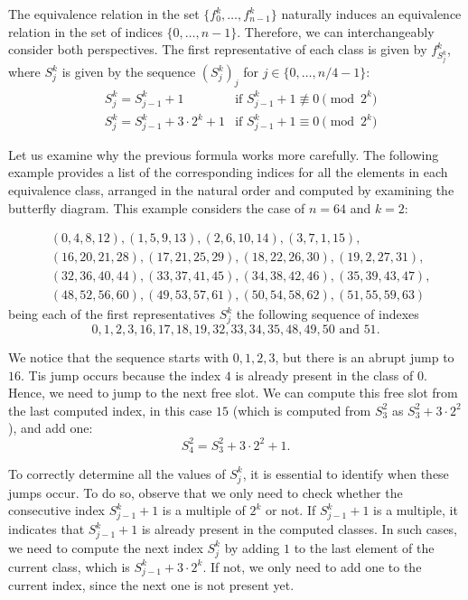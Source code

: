The equivalence relation in the set $\{f_0^k, \dots, f_{n-1}^k \}$ naturally induces an equivalence relation in the set of indices $\{0, \dots, n-1\}$. Therefore, we can interchangeably consider both perspectives. The first representative of each class is given by $f^k_{S_j^k}$, where $S_j^k$ is given by the sequence $\left( S_j^k \right)_j$ for $j \in \{0,\hdots,n/4-1\}$:
\begin{align*}
&S_j^k=S_{j-1}^k + 1                          &\text{if }S_{j-1}^k + 1 \not \equiv 0 \pmod{2^k} \\
&S_j^k=S_{j-1}^k + 3\cdot 2^k + 1           &\text{if }S_{j-1}^k + 1 \equiv 0 \pmod{2^k}
\end{align*}

Let us examine why the previous formula works more carefully. The following example provides a list of the corresponding indices for all the elements in each equivalence class, arranged in the natural order and computed by examining the butterfly diagram. This example considers the case of $n=64$ and $k=2$:

\begin{align*}
& (0,4,8,12), (1,5,9,13), (2,6,10,14), (3,7,1,15), \\
& (16, 20,21,28), (17,21,25,29), (18,22,26,30), (19,2,27,31), \\
& (32,36,40,44), (33,37,41,45), (34, 38, 42, 46), (35, 39, 43, 47), \\
& (48, 52, 56, 60), (49, 53, 57, 61), (50, 54, 58, 62), (51, 55, 59, 63)
\end{align*}
being each of the first representatives $S_j^k$ the following sequence of indexes
\[
0, 1, 2, 3, 16, 17, 18, 19, 32, 33, 34, 35, 48, 49, 50 \text{ and } 51.
\]


We notice that the sequence starts with $0, 1, 2, 3$, but there is an abrupt jump to $16$. Tis jump occurs because the index $4$ is already present in the class of $0$. Hence, we need to jump to the next free slot. We can compute this free slot from the last computed index, in this case $15$ (which is computed from $S_3^2$ as $S_3^2 + 3 \cdot 2^2$), and add one:
\[
S_4^2 = S_3^2 + 3 \cdot 2^2 + 1.
\]

To correctly determine all the values of $S_j^k$, it is essential to identify when these jumps occur. To do so, observe that we only need to check whether the consecutive index $S_{j-1}^k + 1$ is a multiple of $2^k$ or not. If $S_{j-1}^k + 1$ is a multiple, it indicates that $S_{j-1}^k + 1$ is already present in the computed classes.  In such cases, we need to compute the next index $S_j^k$ by adding $1$ to the last element of the current class, which is $S_{j-1}^k + 3 \cdot 2^k$. If not, we only need to add one to the current index, since the next one is not present yet. 


